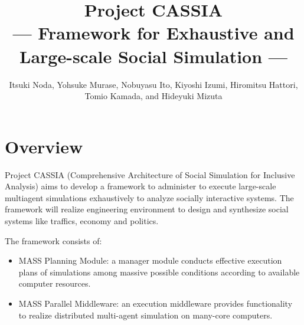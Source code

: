 \title*{Project CASSIA\\
   --- Framework for Exhaustive and Large-scale Social Simulation ---}
\author{%
   Itsuki Noda,
   Yohsuke Murase,
   Nobuyasu Ito,
   Kiyoshi Izumi,
   Hiromitsu Hattori,
   Tomio Kamada, and
   Hideyuki Mizuta}
\maketitle


\section{Overview}
\label{s:Overview}

Project CASSIA (Comprehensive Architecture of Social Simulation for
Inclusive Analysis) aims to develop a framework to administer to
execute large-scale multiagent simulations exhaustively to analyze
socially interactive systems. The framework will realize engineering
environment to design and synthesize social systems like traffics,
economy and politics.

The framework consists of:
\begin{itemize}
  \item
    MASS Planning Module: a manager module conducts effective
    execution plans of simulations among massive possible conditions
    according to available computer resources.
  \item
    MASS Parallel Middleware: an execution middleware provides
    functionality to realize distributed multi-agent simulation on
    many-core computers.
\end{itemize}

